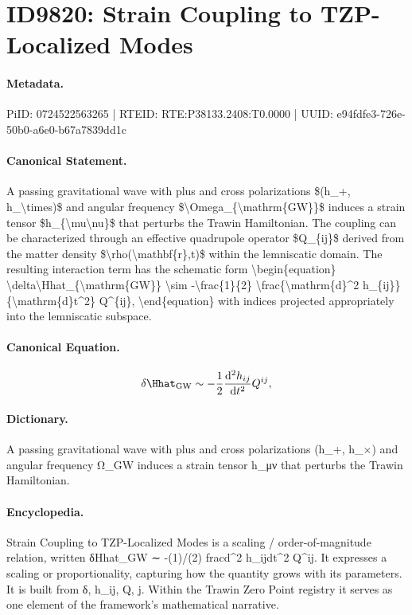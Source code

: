 \section*{ID9820: Strain Coupling to TZP-Localized Modes}
\paragraph{Metadata.}
PiID: 0724522563265 | RTEID: RTE:P38133.2408:T0.0000 | UUID: e94fdfe3-726e-50b0-a6e0-b67a7839dd1c

\paragraph{Canonical Statement.}
A passing gravitational wave with plus and cross polarizations \$(h\_+, h\_\textbackslash{}times)\$ and angular frequency \$\textbackslash{}Omega\_\{\textbackslash{}mathrm\{GW\}\}\$ induces a strain tensor \$h\_\{\textbackslash{}mu\textbackslash{}nu\}\$ that perturbs the Trawin Hamiltonian. The coupling can be characterized through an effective quadrupole operator \$Q\_\{ij\}\$ derived from the matter density \$\textbackslash{}rho(\textbackslash{}mathbf\{r\},t)\$ within the lemniscatic domain. The resulting interaction term has the schematic form \textbackslash{}begin\{equation\} \textbackslash{}delta\textbackslash{}Hhat\_\{\textbackslash{}mathrm\{GW\}\} \textbackslash{}sim -\textbackslash{}frac\{1\}\{2\} \textbackslash{}frac\{\textbackslash{}mathrm\{d\}\textasciicircum{}2 h\_\{ij\}\}\{\textbackslash{}mathrm\{d\}t\textasciicircum{}2\} Q\textasciicircum{}\{ij\}, \textbackslash{}end\{equation\} with indices projected appropriately into the lemniscatic subspace.

\paragraph{Canonical Equation.}
\[
\delta\Hhat_{\mathrm{GW}} \sim -\frac{1}{2} \frac{\mathrm{d}^2 h_{ij}}{\mathrm{d}t^2} Q^{ij},
\]

\paragraph{Dictionary.}
A passing gravitational wave with plus and cross polarizations (h\_+, h\_×) and angular frequency Ω\_GW induces a strain tensor h\_μν that perturbs the Trawin Hamiltonian.

\paragraph{Encyclopedia.}
Strain Coupling to TZP-Localized Modes is a scaling / order-of-magnitude relation, written δHhat\_GW ∼ -(1)/(2) fracd\textasciicircum{}2 h\_ijdt\textasciicircum{}2 Q\textasciicircum{}ij. It expresses a scaling or proportionality, capturing how the quantity grows with its parameters. It is built from δ, h\_ij, Q, j. Within the Trawin Zero Point registry it serves as one element of the framework's mathematical narrative.
